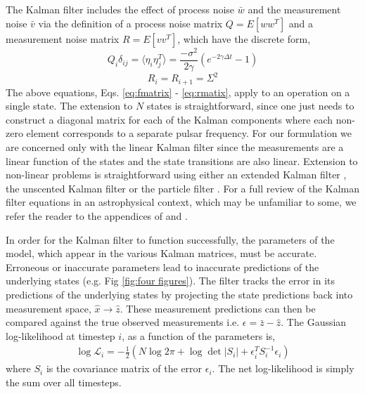 \documentclass[fleqn,usenatbib,useAMS]{mnras}
\begin{document}
\noindent The Kalman filter includes the effect of process noise $\bar{w}$ and the measurement noise $\bar{v}$ via the definition of a process noise matrix $Q = E[w w^T]$ and a measurement noise matrix $R = E[v v^T]$, which have the discrete form,
\begin{equation}
	Q_i  \delta_{ij}= \langle \eta_i \eta_j^T \rangle = \frac{- \sigma^2}{2 \gamma} \left( e^{-2 \gamma \Delta t} -1\right)
\end{equation}
\begin{equation}
	R_i = R_{i+1} = \Sigma^2
	\label{eq:rmatix}
\end{equation}
The above equations, Eqs. \ref{eq:fmatrix} - 	\ref{eq:rmatix}, apply to an operation on a single state. The extension to $N$ states is straightforward, since one just needs to construct a diagonal matrix for each of the Kalman components where each non-zero element corresponds to a separate pulsar frequency. For our formulation we are concerned only with the linear Kalman filter since the measurements are a linear function of the states and the state transitions are also linear. Extension to non-linear problems is straightforward using either an extended Kalman filter \citep{zarchan2000fundamentals}, the unscented Kalman filter \citep{882463van} or the particle filter \citep{Simon10}. For a full review of the  Kalman filter equations in an astrophysical context, which may be unfamiliar to some, we refer the reader to the appendices of \cite{Melatos2023} and  \cite{Meyers2021}. \newline 



\noindent In order for the Kalman filter to function successfully, the parameters of the model, which appear in the various Kalman matrices, must be accurate. Erroneous or inaccurate parameters lead to inaccurate predictions of the underlying states (e.g. Fig \ref{fig:four figures}). The filter tracks the error in its predictions of the underlying states by projecting the state predictions back into measurement space, $\hat{x} \rightarrow \hat{z}$. These measurement predictions can then be compared against the true observed measurements i.e. $ \epsilon = \bar{z} - \hat{z}$. The Gaussian log-likelihood at timestep $i$, as a function of the parameters is,
\begin{eqnarray}
	\log \mathcal{L}_i =  -\frac{1}{2} (N \log 2 \pi + \log \det |S_i| + \epsilon_i^T S_i^{-1} \epsilon_i)
\end{eqnarray}
where $S_i$ is the covariance matrix of the error $\epsilon_i$. The net log-likelihood is simply the sum over all timesteps. 
\end{document}

